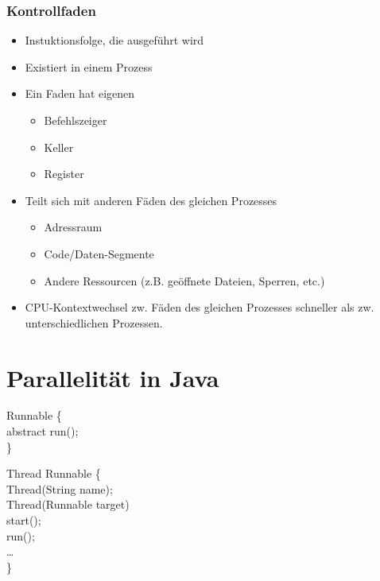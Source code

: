 \subsubsection{Kontrollfaden}
\begin{itemize}
    \item Instuktionsfolge, die ausgeführt wird
    \item Existiert in einem Prozess
    \item Ein Faden hat eigenen 
    \begin{itemize}
        \item Befehlszeiger
        \item Keller
        \item Register
    \end{itemize}
    \item Teilt sich mit anderen Fäden des gleichen Prozesses
    \begin{itemize}
        \item Adressraum
        \item Code/Daten-Segmente
        \item Andere Ressourcen (z.B. geöffnete Dateien, Sperren, etc.)
    \end{itemize}
    \item CPU-Kontextwechsel zw. Fäden des gleichen Prozesses schneller als zw. unterschiedlichen Prozessen.
\end{itemize}



\section{Parallelität in Java}
    \begin{code}
        \javaPublic {}Runnable \{\\
        \null\quad\javaPublic abstract \javaVoid run();\\
        \}\\
    \end{code}
    \begin{code}
        \javaPublic \javaClass Thread Runnable \{\\
        \null\quad\javaPublic Thread(String name);\\
        \null\quad\javaPublic Thread(Runnable target)\\
        \null\quad\javaPublic \javaVoid start();\\
        \null\quad\javaPublic \javaVoid run();\\
        \null\quad\dots\\
        \}\\
    \end{code}

